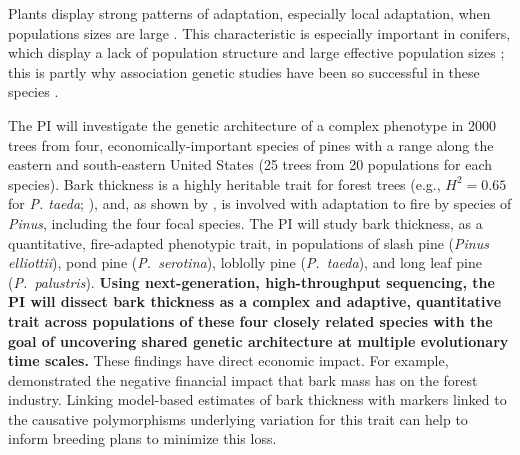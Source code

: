 Plants display strong patterns of adaptation, especially local adaptation, when populations sizes are large \citep{Leimu:2008fb}.
This characteristic is especially important in conifers, which display a lack of population structure and large effective population 
sizes \citep{Neale:2004hi}; this is partly why association genetic studies have been so successful in these species 
\citep{Gupta:2005fx,GonzalezMartinez:2006ij,GonzalezMartinez:2007gy, Eckert:2009hh, Wegrzyn:2010dd, Eckert:2010hd,Eckert:2012cw}.

The PI will investigate the genetic architecture of a complex phenotype in 2000 trees from four, economically-important 
species of pines with a range along the eastern and south-eastern United States (25 trees from 20 populations for each species).
Bark thickness is a highly heritable trait for forest trees (e.g., $H^2 = 0.65$ for \emph{P. taeda}; \citet{Pederick1970}), and, as shown by 
\citet{He:2012bz}, is involved with adaptation to fire by species of \emph{Pinus}, including the four focal species.
The PI will study bark thickness, as a quantitative, fire-adapted phenotypic trait, in populations of slash 
pine (\emph{Pinus elliottii}), pond pine (\emph{P.\ serotina}), loblolly pine (\emph{P.\ taeda}), and long leaf pine 
(\emph{P.\ palustris}).  \textbf{Using next-generation, high-throughput sequencing, the PI will dissect bark thickness as a complex 
and adaptive, quantitative trait across populations of these four closely related species with the goal of uncovering shared genetic 
architecture at multiple evolutionary time scales.}  These findings have direct economic impact.  For example, \citet{Marshall:2006wl} 
demonstrated the negative financial impact that bark mass has on the forest industry.  Linking model-based 
estimates of bark thickness with markers linked to the causative polymorphisms underlying variation for this trait can help to 
inform breeding plans to minimize this loss.


